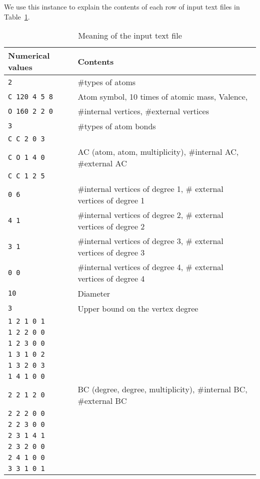 \documentclass[11pt,titlepage,dvipdfmx,twoside]{article}
\begin{document}
We use this instance to explain the contents of each row of input text files
in Table~\ref{tab:InputFormat}.

\bigskip
\begin{table}[H]
\begin{center} \caption{Meaning of the input text file}
\label{tab:InputFormat}
  \begin{tabular}{l|l}
  Numerical values  & Contents \\ \hline \hline
 {\tt 2} & \#types of atoms\\ \hline
{\tt C 120 4 5 8} & Atom symbol, 10 times of atomic mass, Valence,\\
{\tt O 160 2 2 0} &  \phantom{Atom symbol, } \#internal vertices, \#external vertices \\ \hline
{\tt 3} & \#types of atom bonds　\\ \hline
{\tt C C 2 0 3} & \\
{\tt C O 1 4 0} &  AC (atom, atom, multiplicity), \#internal AC, \#external AC\\
{\tt C C 1 2 5} & \\ \hline
{\tt 0 6} & \#internal vertices of degree 1, \# external vertices of degree 1\\ 
{\tt 4 1} & \#internal vertices of degree 2, \# external vertices of degree 2\\ 
{\tt 3 1} & \#internal vertices of degree 3, \# external vertices of degree 3\\ 
{\tt 0 0} & \#internal vertices of degree 4, \# external vertices of degree 4\\  \hline
{\tt 10} & Diameter　\\ \hline
{\tt 3} & Upper bound on the vertex degree　\\ \hline
{\tt 1 2 1 0 1} & \\
{\tt 1 2 2 0 0} & \\
{\tt 1 2 3 0 0} & \\
{\tt 1 3 1 0 2} & \\
{\tt 1 3 2 0 3} & \\
{\tt 1 4 1 0 0} & \\
{\tt 2 2 1 2 0} & BC (degree, degree, multiplicity), \#internal BC, \#external BC\\
{\tt 2 2 2 0 0} & \\
{\tt 2 2 3 0 0} & \\
{\tt 2 3 1 4 1} & \\
{\tt 2 3 2 0 0 }& \\
{\tt 2 4 1 0 0 }& \\
{\tt 3 3 1 0 1} & \\

\end{tabular}
\end{center}
\end{table}
\end{document}
